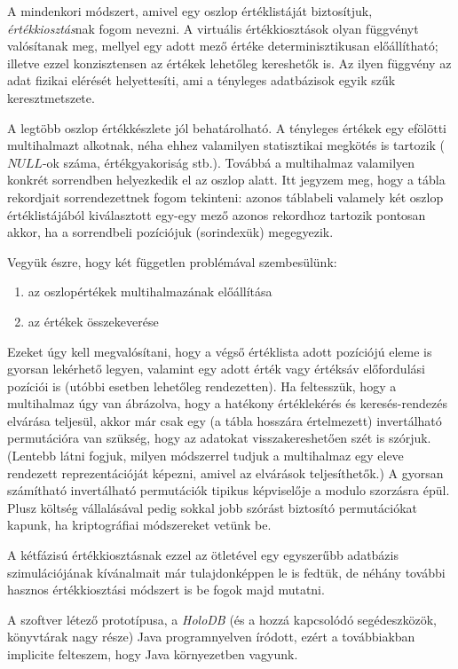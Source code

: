 \documentclass[
    parspace,
    noindent,
    nohyp,
]{elteiktdk}[2023/04/10]
\begin{document}
A mindenkori módszert, amivel egy oszlop értéklistáját biztosítjuk,
\textit{értékkiosztás}nak fogom nevezni.
A virtuális értékkiosztások olyan függvényt valósítanak meg,
mellyel egy adott mező értéke determinisztikusan előállítható;
illetve ezzel konzisztensen az értékek lehetőleg kereshetők is.
Az ilyen függvény az adat fizikai elérését helyettesíti,
ami a tényleges adatbázisok egyik szűk keresztmetszete.

A legtöbb oszlop értékkészlete jól behatárolható.
A tényleges értékek egy efölötti multihalmazt alkotnak,
néha ehhez valamilyen statisztikai megkötés is tartozik ($NULL$-ok száma, értékgyakoriság stb.).
Továbbá a multihalmaz valamilyen konkrét sorrendben helyezkedik el az oszlop alatt.
Itt jegyzem meg, hogy a tábla rekordjait sorrendezettnek fogom tekinteni:
azonos táblabeli valamely két oszlop értéklistájából kiválasztott egy-egy mező
azonos rekordhoz tartozik pontosan akkor, ha a sorrendbeli pozíciójuk (sorindexük) megegyezik.

Vegyük észre, hogy két független problémával szembesülünk:

\begin{enumerate}
    \item az oszlopértékek multihalmazának előállítása
    \item az értékek összekeverése
\end{enumerate}

Ezeket úgy kell megvalósítani, hogy a végső értéklista adott pozíciójú eleme is gyorsan lekérhető legyen,
valamint egy adott érték vagy értéksáv előfordulási pozíciói is
(utóbbi esetben lehetőleg rendezetten).
Ha feltesszük, hogy a multihalmaz úgy van ábrázolva,
hogy a hatékony értéklekérés és keresés-rendezés elvárása teljesül,
akkor már csak egy (a tábla hosszára értelmezett) invertálható permutációra van szükség,
hogy az adatokat visszakereshetően szét is szórjuk.
(Lentebb látni fogjuk, milyen módszerrel tudjuk a multihalmaz egy eleve rendezett reprezentációját képezni,
amivel az elvárások teljesíthetők.)
A gyorsan számítható invertálható permutációk tipikus képviselője a modulo szorzásra épül.
Plusz költség vállalásával pedig sokkal jobb szórást biztosító permutációkat kapunk,
ha kriptográfiai módszereket vetünk be.

A kétfázisú értékkiosztásnak ezzel az ötletével
egy egyszerűbb adatbázis szimulációjának kívánalmait már tulajdonképpen le is fedtük,
de néhány további hasznos értékkiosztási módszert is be fogok majd mutatni.

A szoftver létező prototípusa, a \textit{HoloDB}
(és a hozzá kapcsolódó segédeszközök, könyvtárak nagy része) Java programnyelven íródott,
ezért a továbbiakban implicite felteszem, hogy Java környezetben vagyunk.
\end{document}
